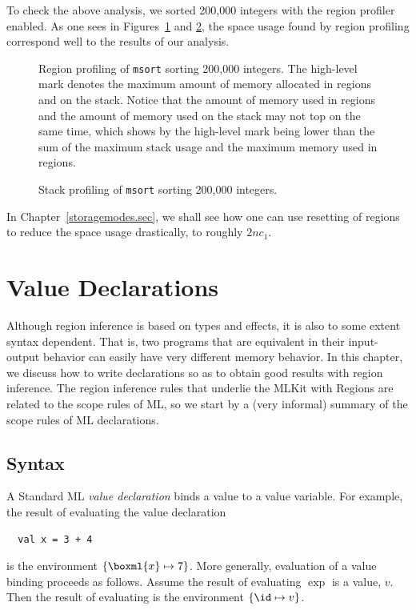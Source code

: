 \documentclass[12pt]{book}
\begin{document}
To check the above analysis, we sorted 200,000 integers with the region
profiler enabled.  As one sees in Figures~\ref{msortregion.fig} and
\ref{msortstack.fig}, the space usage found by region profiling
correspond well to the results of our analysis.
\begin{figure}%
\caption{Region profiling of {\tt msort} sorting 200,000 integers. The
  high-level mark denotes the maximum amount of memory allocated in
  regions and on the stack. Notice that the amount of memory used in
  regions and the amount of memory used on the stack may not top on
  the same time, which shows by the high-level mark being lower than
  the sum of the maximum stack usage and the maximum memory used in
  regions.}
\label{msortregion.fig}
\end{figure}

\begin{figure}%
\caption{Stack profiling of {\tt msort} sorting 200,000 integers.}
\label{msortstack.fig}
\end{figure}

In Chapter~\ref{storagemodes.sec}, we shall see how one can use
resetting of regions to reduce the space usage drastically, to roughly
$2nc_1$.
%

\chapter{Value Declarations}
\label{valdecl.sec}

Although region inference is based on types and effects, it is also to
some extent syntax dependent. That is, two programs that are
equivalent in their input-output behavior can easily have very
different memory behavior. In this chapter, we discuss how to write
%
declarations so as to obtain good results with region inference. The
region inference rules that underlie the MLKit with Regions are
related to the scope rules of ML, so we start by a (very informal)
summary of the scope rules of ML declarations.

\section{Syntax}
A Standard ML {\em value declaration} binds a value to a value
%
variable. For example, the result of evaluating the value declaration
\begin{verbatim}
  val x = 3 + 4
\end{verbatim}
is the
%
environment $\{\boxml{x}\mapsto 7\}$. More generally, evaluation of a
value binding  proceeds as follows. Assume
the result of evaluating $\exp$ is a value, $v$.  Then the result of
evaluating  is the environment $\{\id\mapsto
v\}$.
\end{document}
